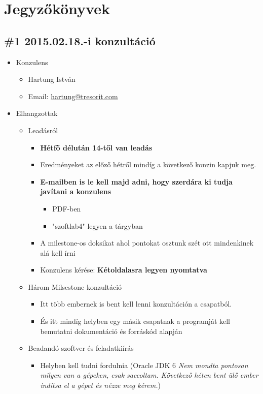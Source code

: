 \documentclass{article}
\begin{document}
\section{Jegyzőkönyvek}
\subsection{\#1 2015.02.18.-i konzultáció}

\begin{itemize}
	\item Konzulens
		\begin{itemize}
		\item Hartung István
		\item Email: \href{mailto:hartung@tresorit.com}{hartung@tresorit.com}
		\end{itemize}
	\item Elhangzottak
		\begin{itemize}
			\item Leadásról
			\begin{itemize}
				\item \textbf{Hétfő délután 14-től van leadás}
				\item Eredményeket az előző hétről mindíg a következő konzin kapjuk meg.
				\item \textbf{E-mailben is le kell majd adni, hogy szerdára ki tudja javítani a konzulens}
				\begin{itemize}
					\item PDF-ben
					\item "szoftlab4" legyen a tárgyban
				\end{itemize}
				\item A milestone-os doksikat ahol pontokat osztunk szét ott mindenkinek alá kell írni
				\item Konzulens kérése: \textbf{Kétoldalasra legyen nyomtatva}
			\end{itemize}
			\item Három Milsestone konzultáció
			\begin{itemize}
				\item Itt több embernek is bent kell lenni konzultáción a csapatból.
				\item És itt mindíg helyben egy másik csapatnak a programját kell bemutatni dokumentáció és forráskód alapján
			\end{itemize}
			\item Beadandó szoftver és feladatkiírás
			\begin{itemize}
				\item Helyben kell tudni fordulnia (Oracle JDK 6 \textit{Nem mondta pontosan milyen van a gépeken, csak saccoltam. Következő héten bent ülő ember indítsa el a gépet és nézze meg kérem.})

\end{itemize}
\end{itemize}
\end{itemize}
\end{document}
